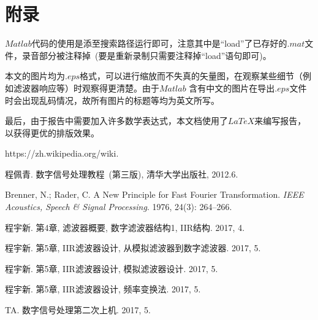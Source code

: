 \documentclass[a4paper,11pt,onecolumn,twoside]{article}
\begin{document}
\section{附录}
$Matlab$代码的使用是添至搜索路径运行即可，注意其中是``load''了已存好的$.mat$文件，录音部分被注释掉~(要是重新录制只需要注释掉``load''语句即可)。

本文的图片均为$.eps$格式，可以进行缩放而不失真的矢量图，在观察某些细节（例如滤波器响应等）时观察得更清楚。由于$Matlab$ 含有中文的图片在导出$.eps$文件时会出现乱码情况，故所有图片的标题等均为英文所写。

最后，由于报告中需要加入许多数学表达式，本文档使用了$LaTeX$来编写报告，以获得更优的排版效果。

\small
\begin{thebibliography}{99}
\setlength{\parskip}{0pt}  %

https://zh.wikipedia.org/wiki.

程佩青. 数字信号处理教程~(第三版), 清华大学出版社, 2012.6.

Brenner, N.; Rader, C. A New Principle for Fast Fourier Transformation. \emph{IEEE Acoustics, Speech \& Signal Processing}. 1976, 24(3): 264–266.

程宇新. 第4章, 滤波器概要, 数字滤波器结构1, IIR结构. 2017, 4.

程宇新. 第5章, IIR滤波器设计, 从模拟滤波器到数字滤波器. 2017, 5.

程宇新. 第5章, IIR滤波器设计, 模拟滤波器设计. 2017, 5.

程宇新. 第5章, IIR滤波器设计, 频率变换法. 2017, 5.

TA. 数字信号处理第二次上机. 2017, 5.

\end{thebibliography}

\clearpage
\end{document}
